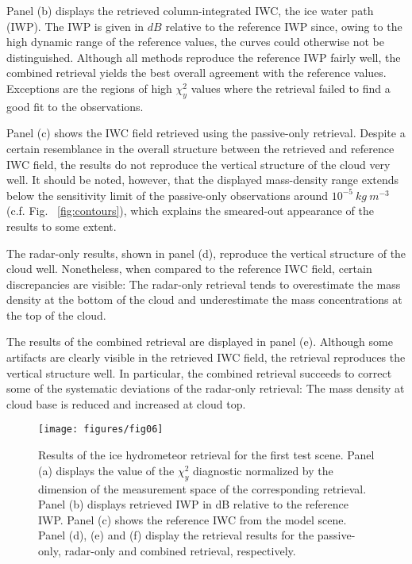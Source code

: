 \documentclass[journal abbreviation, manuscript]{copernicus}
\begin{document}
Panel (b) displays the retrieved column-integrated IWC, the ice water path
(IWP). The IWP is given in $\unit{dB}$ relative to the reference IWP since,
owing to the high dynamic range of the reference values, the curves could
otherwise not be distinguished. Although all methods reproduce the reference
IWP fairly well, the combined retrieval yields the best overall agreement with
the reference values. Exceptions are the regions of high $\chi^2_y$ values where
the retrieval failed to find a good fit to the observations.

Panel (c) shows the IWC field retrieved using the passive-only retrieval.
Despite a certain resemblance in the overall structure between the retrieved and
reference IWC field, the results do not reproduce the vertical structure of the
cloud very well. It should be noted, however, that the displayed mass-density
range extends below the sensitivity limit of the passive-only observations
around $10^{-5}\ \unit{kg\ m^{-3}}$ (c.f. Fig. ~\ref{fig:contours}), which explains
the smeared-out appearance of the results to some extent.

The radar-only results, shown in panel (d), reproduce the vertical structure of
the cloud well. Nonetheless, when compared to the reference IWC field, certain
discrepancies are visible: The radar-only retrieval tends to overestimate the
mass density at the bottom of the cloud and underestimate the mass
concentrations at the top of the cloud.

The results of the combined retrieval are displayed in panel (e). Although some
artifacts are clearly visible in the retrieved IWC field, the retrieval
reproduces the vertical structure well. In particular, the combined retrieval
succeeds to correct some of the systematic deviations of the radar-only
retrieval: The mass density at cloud base is reduced and increased at cloud top.

\begin{figure}
\centering
\texttt{[image: figures/fig06]}
\caption{Results of the ice hydrometeor retrieval for the first test scene.
  Panel (a) displays the value of the $\chi^2_y$ diagnostic normalized by the
  dimension of the measurement space of the corresponding retrieval. Panel (b)
  displays retrieved IWP in dB relative to the reference IWP. Panel (c) shows
  the reference IWC from the model scene. Panel (d), (e) and (f) display the
  retrieval results for the passive-only, radar-only and combined retrieval,
  respectively.}
\label{fig:results_a}
\end{figure}
\end{document}
